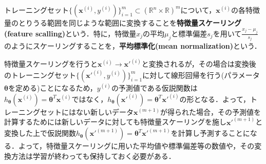 \begin{defi}[特徴量スケーリング]
トレーニングセット$\{({\bm x}^{(i)},y^{(i)})\}_{i=1}^m\subset (\mathbb{R}^n \times \mathbb{R})^m$について，${\bm x}^{(i)}$の各特徴量のとりうる範囲を同じような範囲に変換することを{\bf 特徴量スケーリング(feature scalling)}という．特に，特徴量$x_j$の平均$\mu_j$と標準偏差$s_j$を用いて$\frac{x_j-\mu_j}{s_j}$のようにスケーリングすることを，{\bf 平均標準化(mean normalization)}という．
\end{defi}

\begin{rem}
特徴量スケーリングを行うと${\bm x}^{(i)}\to {\bm x}'^{(i)}$と変換されるが，その場合は変換後のトレーニングセット$\{({\bm x}'^{(i)},y^{(i)})\}_{i=1}^m$に対して線形回帰を行う(パラメータ${\bm \theta}$を定める)ことになるため，$y^{(i)}$の予測値である仮説関数は$h_{{\bm \theta}}({\bm x}^{(i)})={\bm \theta}^T{\bm x}^{(i)}$ではなく，$h_{{\bm \theta}}({\bm x}'^{(i)})={\bm \theta}^T{\bm x}'^{(i)}$の形となる．よって，トレーニングセットにはない新しいデータ${\bm x}^{(m+1)}$が得られた場合，その予測値を計算するためには新しいデータに対しても特徴量スケーリングを施し${\bm x}'^{(m+1)}$と変換した上で仮説関数$h_{{\bm \theta}}({\bm x}'^{(m+1)})={\bm \theta}^T{\bm x}'^{(m+1)}$を計算し予測することになる．よって，特徴量スケーリングに用いた平均値や標準偏差等の数値や，その変換方法は学習が終わっても保持しておく必要がある．
\end{rem}

